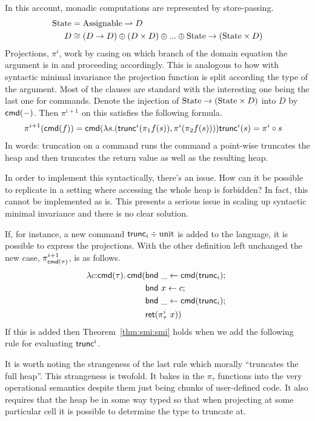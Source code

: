 In this account, monadic computations are represented by
store-passing.
\begin{align*}
  \mathrm{State} &= \mathrm{Assignable} \rightharpoonup D\\
  D &\cong (D \to D) \oplus (D \times D) \oplus ... \oplus \mathrm{State} \to (\mathrm{State} \times D)
\end{align*}
Projections, $\pi^i$, work by casing on which branch of the domain
equation the argument is in and proceeding accordingly. This is
analogous to how with syntactic minimal invariance the projection
function is split according the type of the argument. Most of the
clauses are standard with the interesting one being the last one for
commands. Denote the injection of $\mathrm{State} \to (\mathrm{State} \times D)$
into $D$ by $\mathsf{cmd}(-)$. Then $\pi^{i + 1}$ on this satisfies the
following formula.
\begin{align*}
  \pi^{i + 1}(\mathsf{cmd}(f)) &=
  \mathsf{cmd}(\lambda s. (\mathsf{trunc}^i(\pi_1 f(s)), \pi^i(\pi_2 f(s))))
  \mathsf{trunc}^i(s) = \pi^i \circ s
\end{align*}
In words: truncation on a command runs the command a point-wise
truncates the heap and then truncates the return value as well as the
resulting heap.

In order to implement this syntactically, there's an issue. How can it
be possible to replicate in a setting where accessing the whole heap
is forbidden? In fact, this cannot be implemented as is. This presents
a serious issue in scaling up syntactic minimal invariance and there
is no clear solution.

If, for instance, a new command $\mathsf{trunc}_i \div \mathrm{unit}$ is
added to the language, it is possible to express the projections. With
the other definition left unchanged the new case,
$\pi_{\mathsf{cmd}(\tau)}^{i + 1}$, is as follows.
\begin{align*}
  \lambda c {:} \mathsf{cmd}(\tau).\, \mathsf{cmd}(& \mathsf{bnd}\ \_ \gets \mathsf{cmd}(\mathsf{trunc}_i);\ \\
        & \mathsf{bnd}\ x \gets c;\ \\
        & \mathsf{bnd}\ \_ \gets \mathsf{cmd}(\mathsf{trunc}_i);\ \\
        & \mathsf{ret}(\pi_\tau^i\ x))
\end{align*}
If this is added then Theorem~\ref{thm:smi:smi} holds when we add the
following rule for evaluating $\mathsf{trunc}^i$.
It is worth noting the strangeness of the last rule which morally
``truncates the full heap''. This strangeness is twofold. It bakes in
the $\pi_\tau$ functions into the very operational semantics despite
them just being chunks of user-defined code. It also requires that the
heap be in some way typed so that when projecting at some particular
cell it is possible to determine the type to truncate at.

